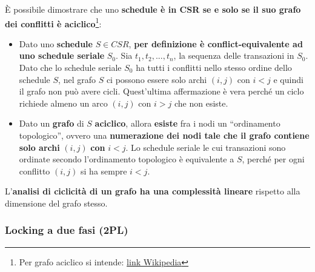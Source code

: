 \documentclass[a4paper]{article}
\newcommand{\dquotes}[1]{``#1''}
\begin{document}
	\noindent
	È possibile dimostrare che uno \textbf{schedule è in CSR se e solo se il suo grafo dei conflitti è aciclico}\footnote{Per grafo aciclico si intende: \href{https://it.wikipedia.org/wiki/Digrafo_aciclico}{link Wikipedia}}:
	\begin{itemize}
		\item Dato uno \textbf{schedule} $S \in CSR$, \textbf{per definizione è conflict-equivalente ad uno schedule seriale} $S_{0}$.\newline
		Sia $t_{1}, t_{2}, ..., t_{n}$, la sequenza delle transazioni in $S_{0}$. Dato che lo schedule seriale $S_{0}$ ha tutti i conflitti nello stesso ordine dello schedule $S$, nel grafo $S$ ci possono essere solo archi $\left(i,j\right)$ con $i < j$ e quindi il grafo non può avere cicli. Quest'ultima affermazione è vera perché un ciclo richiede almeno un arco $\left(i,j\right)$ con $i > j$ che non esiste.
		
		\item Dato un \textbf{grafo} di $S$ \textbf{aciclico}, allora \textbf{esiste} fra i nodi un \dquotes{ordinamento topologico}, ovvero una \textbf{numerazione dei nodi tale che il grafo contiene solo archi} $\left(i,j\right)$ \textbf{con} $i < j$.\newline
		Lo schedule seriale le cui transazioni sono ordinate secondo l'ordinamento topologico è equivalente a $S$, perché per ogni conflitto $\left(i,j\right)$ si ha sempre $i < j$.
	\end{itemize}\:\newline

	\noindent
	L'\textbf{analisi di ciclicità di un grafo ha una complessità lineare} rispetto alla dimensione del grafo stesso.\newpage
	
	\subsubsection{Locking a due fasi (2PL)}
	
\end{document}

